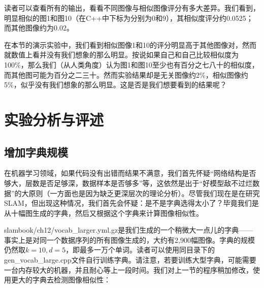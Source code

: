 读者可以查看所有的输出，看看不同图像与相似图像评分有多大差异。我们看到，明显相似的图1和图10（在C++中下标为分别为0和9），其相似度评分约0.0525；而其他图像约为0.02。

在本节的演示实验中，我们看到相似图像1和10的评分明显高于其他图像对，然而就数值上看并没有我们想象的那么明显。按说如果自己和自己比较相似度为100\%，那么我们（从人类角度）认为图1和图10至少也有百分之七八十的相似度，而其他图可能为百分之二三十。然而实验结果却是无关图像约2\%，相似图像约5\%，似乎没有我们想象的那么明显。这是否是我们想要看到的结果呢？

\section{实验分析与评述}
\subsection{增加字典规模}
在机器学习领域，如果代码没有出错而结果不满意，我们首先怀疑“网络结构是否够大，层数是否足够深，数据样本是否够多”等，这依然是出于“好模型敌不过烂数据”的大原则（一方面也是因为缺乏更深层次的理论分析）。尽管我们现在是在研究SLAM，但出现这种情况，我们首先会怀疑：是不是字典选得太小了？毕竟我们是从十幅图生成的字典，然后又根据这个字典来计算图像相似性。

slambook/ch12/vocab\_larger.yml.gz是我们生成的一个稍微大一点儿的字典——事实上是对同一个数据序列的所有图像生成的，大约有2,900幅图像。字典的规模仍然取$k=10,d=5$，即最多一万个单词。读者可以使用同目录下的gen\_vocab\_large.cpp文件自行训练字典。请注意，若要训练大型字典，可能需要一台内存较大的机器，并且耐心等上一段时间。我们对上一节的程序稍加修改，使用更大的字典去检测图像相似性：


